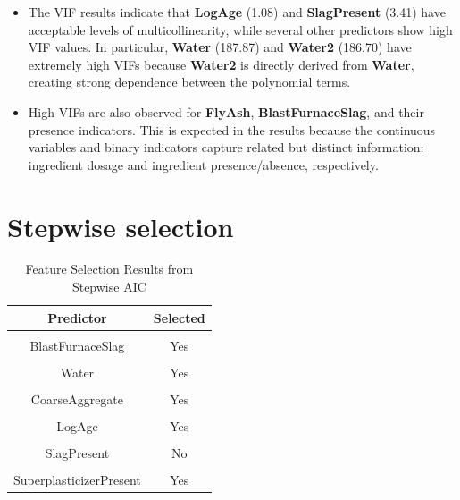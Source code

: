 \documentclass[
  11pt,
]{article}
\begin{document}
\begin{itemize}
\item
  The VIF results indicate that \textbf{LogAge} (1.08) and
  \textbf{SlagPresent} (3.41) have acceptable levels of
  multicollinearity, while several other predictors show high VIF
  values. In particular, \textbf{Water} (187.87) and \textbf{Water2}
  (186.70) have extremely high VIFs because \textbf{Water2} is directly
  derived from \textbf{Water}, creating strong dependence between the
  polynomial terms.
\item
  High VIFs are also observed for \textbf{FlyAsh},
  \textbf{BlastFurnaceSlag}, and their presence indicators. This is
  expected in the results because the continuous variables and binary
  indicators capture related but distinct information: ingredient dosage
  and ingredient presence/absence, respectively.
\end{itemize}

\section{Stepwise selection}\label{stepwise-selection}

\begin{table}[!h]
\centering
\caption{\label{tab:stepwise}Feature Selection Results from Stepwise AIC}
\centering
\fontsize{10}{12}\selectfont
\begin{tabular}[t]{cc}
\toprule
\textbf{Predictor} & \textbf{Selected}\\
\midrule
\cellcolor{gray!10}{Cement} & \cellcolor{gray!10}{Yes}\\
BlastFurnaceSlag & Yes\\
\cellcolor{gray!10}{FlyAsh} & \cellcolor{gray!10}{Yes}\\
Water & Yes\\
\cellcolor{gray!10}{Superplasticizer} & \cellcolor{gray!10}{Yes}\\
\addlinespace
CoarseAggregate & Yes\\
\cellcolor{gray!10}{FineAggregate} & \cellcolor{gray!10}{Yes}\\
LogAge & Yes\\
\cellcolor{gray!10}{Water2} & \cellcolor{gray!10}{Yes}\\
SlagPresent & No\\
\addlinespace
\cellcolor{gray!10}{FlyAshPresent} & \cellcolor{gray!10}{Yes}\\
SuperplasticizerPresent & Yes\\
\bottomrule
\end{tabular}
\end{table}
\end{document}
